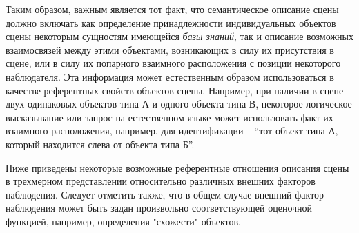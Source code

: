 Таким образом, важным является тот факт, что семантическое описание сцены должно включать как определение принадлежности индивидуальных объектов сцены некоторым сущностям имеющейся \textit{базы знаний}, так и описание возможных взаимосвязей между этими объектами, возникающих в силу их присутствия в сцене, или в силу их попарного взаимного расположения с позиции некоторого наблюдателя. Эта информация может естественным образом использоваться в качестве референтных свойств объектов сцены. Например, при наличии в сцене двух одинаковых объектов типа А и одного объекта типа В, некоторое логическое высказывание или запрос на естественном языке может использовать факт их взаимного расположения, например, для идентификации -- ``тот объект типа А, который находится слева от объекта типа Б''.


\begin{SCn}
\end{SCn}
\begin{SCn}
\end{SCn}
\begin{SCn}
\end{SCn}


Ниже приведены некоторые возможные референтные отношения описания сцены в трехмерном представлении относительно различных внешних факторов наблюдения. Следует отметить также, что в общем случае внешний фактор наблюдения может быть задан произвольно соответствующей оценочной функцией, например, определения "схожести"{} объектов.

